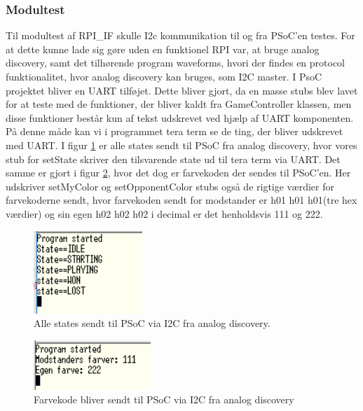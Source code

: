 \documentclass[Rapport/Playerside/RPI_IF/RPI_IF.tex]{subfiles}
\begin{document}
\subsubsection{Modultest}
Til modultest af RPI\_IF skulle I2c kommunikation til og fra PSoC'en testes. For at dette kunne lade sig gøre uden en funktionel RPI var, at bruge analog discovery, samt det tilhørende program waveforms, hvori der findes en protocol funktionalitet, hvor analog discovery kan bruges, som I2C master. I PsoC projektet bliver en UART tilføjet. Dette bliver gjort, da en masse stubs blev lavet for at teste med de funktioner, der bliver kaldt fra GameController klassen, men disse funktioner består kun af tekst udskrevet ved hjælp af UART komponenten. På denne måde kan vi i programmet tera term se de ting, der bliver udskrevet med UART. I figur \ref{fig:state_change} er alle states sendt til PSoC fra analog discovery, hvor vores stub for setState skriver den tilsvarende state ud til tera term via UART. Det samme er gjort i figur \ref{fig:color_change}, hvor det dog er farvekoden der sendes til PSoC'en. Her udskriver setMyColor og setOpponentColor stubs også de rigtige værdier for farvekoderne sendt, hvor farvekoden sendt for modstander er h01 h01 h01(tre hex værdier) og sin egen h02 h02 h02 i decimal er det henholdsvis 111 og 222.
\begin{figure}
    \centering 
    \includegraphics[width=0.5\linewidth]{Rapport/Playerside/graphics/RPI_IF/states.PNG}
    \caption{Alle states sendt til PSoC via I2C fra analog discovery.}
    \label{fig:state_change}
\end{figure}
\begin{figure}
    \centering 
    \includegraphics[width=0.5\linewidth]{Rapport/Playerside/graphics/RPI_IF/farvekode.PNG}
    \caption{Farvekode bliver sendt til PSoC via I2C fra analog discovery}
    \label{fig:color_change}
\end{figure}
\end{document}
